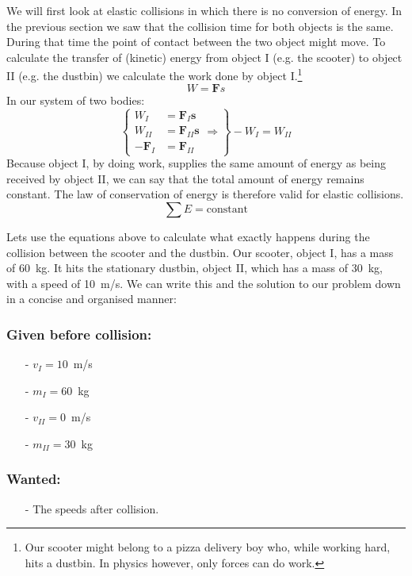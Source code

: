 We will first look at elastic collisions in which there is no conversion of energy. In the previous section we saw that the collision time for both objects is the same. During that time the point of contact between the two object might move. To calculate the transfer of (kinetic) energy from object I (e.g. the scooter) to object II (e.g. the dustbin) we calculate the work done by object I.\footnote{Our scooter might belong to a pizza delivery boy who, while working hard, hits a dustbin. In physics however, only forces can do work.}
\begin{equation}
W=\textbf{F}s
\end{equation}
In our system of two bodies:
\begin{equation}
\left\lbrace  \begin{array}{rl}
W_I &= \textbf{F}_I \textbf{s} \\
W_{II} &= \textbf{F}_{II} \textbf{s} \\
-\textbf{F}_I &= \textbf{F}_{II} \end{array} \Rightarrow \right\rbrace -W_I = W_{II}
\end{equation}
Because object I, by doing work, supplies the same amount of energy as being received by object II, we can say that the total amount of energy remains constant. The law of conservation of energy is therefore valid for elastic collisions.
\begin{equation}
\sum E =\mbox{constant}
\end{equation}

Lets use the equations above to calculate what exactly happens during the collision between the scooter and the dustbin. Our scooter, object I, has a mass of 60~kg. It hits the stationary dustbin, object II, which has a mass of 30~kg, with a speed of 10~m/s. We can write this and the solution to our problem down in a concise and organised manner:

\subsubsection*{Given before collision:}
\begin{itemize}
\item[-] $v_I = 10$~m/s
\item[-] $m_I = 60$~kg
\item[-] $v_{II} = 0$~m/s
\item[-] $m_{II} = 30$~kg
\end{itemize}

\subsubsection*{Wanted:}
\begin{itemize}
\item[-] The speeds after collision.
\end{itemize}


